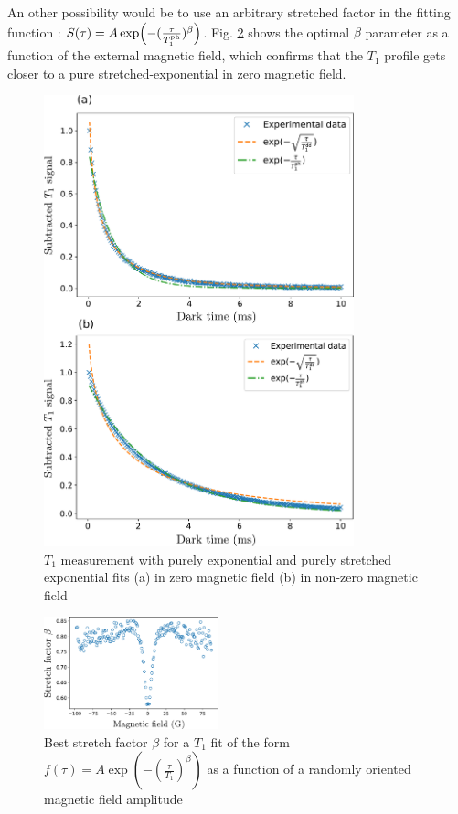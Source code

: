 \documentclass[preprintnumbers,amsmath,amssymb,onecolumn,12pt]{revtex4-2}\usepackage{graphicx}%
\begin{document}
An other possibility would be to use an arbitrary stretched factor in the fitting function : $S(\tau)=A \exp (-(\frac{\tau}{T_1^{\rm ph}})^\beta )$. Fig. \ref{alphas} shows the optimal $\beta$ parameter as a function of the external magnetic field, which confirms that the $T_1$ profile gets closer to a pure stretched-exponential in zero magnetic field.
\begin{figure}
\includegraphics[width=0.8\textwidth]{Figures_SI/Fig_T1_combined}
\caption{$T_1$ measurement with purely exponential and purely stretched exponential fits (a) in zero magnetic field (b) in non-zero magnetic field}
\label{T1_fits}
\end{figure}
\begin{figure}
\includegraphics[width=0.45\textwidth]{Figures_SI/fig_alphas}
\caption{Best stretch factor $\beta$ for a $T_1$ fit of the form $f(\tau)=A \exp(-(\frac{\tau}{T_1})^\beta)$ as a function of a randomly oriented magnetic field amplitude}
\label{alphas}
\end{figure}
\end{document}
